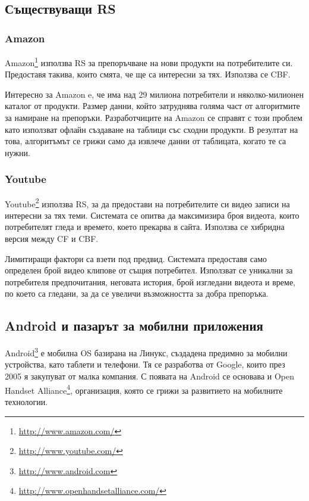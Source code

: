 	\subsection{Съществуващи \ac{RS}}
	
		\subsubsection{Amazon}
		
			Amazon\footnote{\url{http://www.amazon.com/}} използва \ac{RS} за препоръчване на нови продукти на потребителите си. Предоставя такива, които смята, че ще са интересни за тях. Използва се \ac{CBF}.
			
			Интересно за Amazon e, че има над 29 милиона потребители и няколко-милионен каталог от продукти. Размер данни, който затруднява голяма част от алгоритмите за намиране на препоръки. Разработчиците на Amazon се справят с този проблем като използват офлайн създаване на таблици със сходни продукти. В резултат на това, алгоритъмът се грижи само да извлече данни от таблицата, когато те са нужни.
	
		\subsubsection{Youtube}
		
			Youtube\footnote{\url{http://www.youtube.com/}} използва \ac{RS}, за да предостави на потребителите си видео записи на интересни за тях теми. Системата се опитва да максимизира броя видеота, които потребителят гледа и времето, което прекарва в сайта. Използва се хибридна версия между \ac{CF} и \ac{CBF}.
			
			Лимитиращи фактори са взети под предвид. Системата предоставя само определен брой видео клипове от същия потребител. Използват се уникални за потребителя предпочитания, неговата история, брой изгледани видеота и време, по което са гледани, за да се увеличи възможността за добра препоръка.
	
	\subsection{Android и пазарът за мобилни приложения}
	
		Android\footnote{\url{http://www.android.com}} е мобилна \ac{OS} базирана на Линукс, създадена предимно за мобилни устройства, като таблети и телефони. Тя се разработва от Google, които през 2005 я закупуват от малка компания\cite{Elgin}. С появата на Android се основава и Open Handset Alliance\footnote{\url{http://www.openhandsetalliance.com/}}, организация, която се грижи за развитието на мобилните технологии.
	
